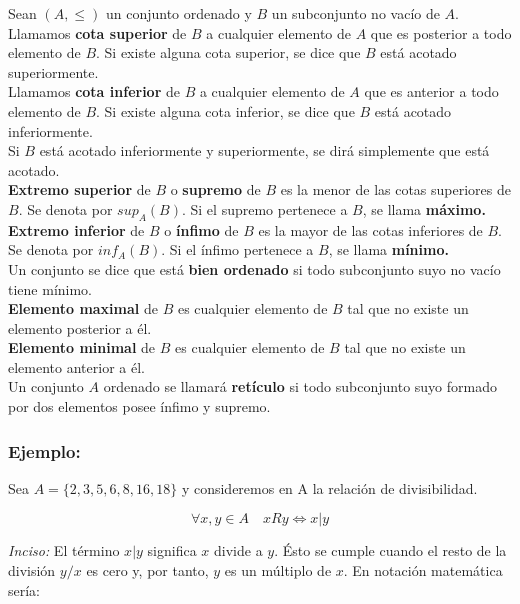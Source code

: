 Sean $(A,\leq )$ un conjunto ordenado y $B$ un subconjunto no vacío de $A$.\\
 
Llamamos \textbf{cota superior} de $B$ a cualquier elemento de $A$ que es posterior a todo elemento de $B$. Si existe alguna cota superior, se dice que $B$ está acotado superiormente.\\

Llamamos \textbf{cota inferior} de $B$ a cualquier  elemento de $A$ que es anterior a todo elemento de $B$. Si existe alguna cota inferior, se dice que $B$ está acotado inferiormente.\\

Si $B$ está acotado inferiormente y superiormente, se dirá simplemente que está acotado.\\

\textbf{Extremo superior} de $B$ o \textbf{supremo} de $B$ es la menor de las cotas superiores de $B$. Se denota por $sup_A(B)$. Si el supremo pertenece a $B$, se llama \textbf{máximo.}\\

\textbf{Extremo inferior} de $B$ o \textbf{ínfimo} de $B$ es la mayor de las cotas inferiores de $B$. Se denota por $inf_A(B)$. Si el ínfimo pertenece a $B$, se llama \textbf{mínimo.}\\

Un conjunto se dice que está \textbf{bien ordenado} si todo subconjunto suyo no vacío tiene mínimo.\\

\textbf{Elemento maximal} de $B$ es cualquier elemento de $B$ tal que no existe un elemento posterior a él.\\

\textbf{Elemento minimal} de $B$ es cualquier elemento de $B$ tal que no existe un elemento anterior a él.\\

Un conjunto $A$ ordenado se llamará \textbf{retículo} si todo subconjunto suyo formado por dos elementos posee ínfimo y supremo.\\

\subsubsection*{Ejemplo:}
Sea $A=\lbrace 2,3,5,6,8,16,18 \rbrace$ y consideremos en A la relación de divisibilidad.

$$
\forall x,y \in A \quad x R y \Leftrightarrow x|y
$$

\emph{Inciso: }El término $x|y$ significa $x$ divide a $y$. Ésto se cumple cuando el resto de la división $y/x$ es cero y, por tanto, $y$ es un múltiplo de $x$. En notación matemática sería:

